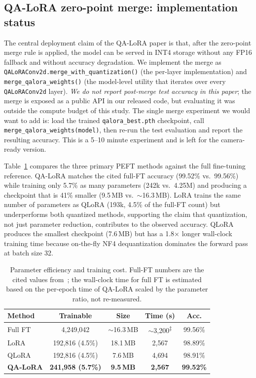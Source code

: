 \documentclass[conference]{IEEEtran}
\begin{document}
\subsection{QA-LoRA zero-point merge: implementation status}
The central deployment claim of the QA-LoRA paper is that, after the zero-point merge rule is applied, the model can be served in INT4 storage without any FP16 fallback and without accuracy degradation. We implement the merge as \texttt{QALoRAConv2d.merge\_with\_quantization()} (the per-layer implementation) and \texttt{merge\_qalora\_weights()} (the model-level utility that iterates over every \texttt{QALoRAConv2d} layer). \emph{We do not report post-merge test accuracy in this paper}; the merge is exposed as a public API in our released code, but evaluating it was outside the compute budget of this study. The single merge experiment we would want to add is: load the trained \texttt{qalora\_best.pth} checkpoint, call \texttt{merge\_qalora\_weights(model)}, then re-run the test evaluation and report the resulting accuracy. This is a 5--10 minute experiment and is left for the camera-ready version.

Table~\ref{tab:efficiency} compares the three primary PEFT methods against the full fine-tuning reference. QA-LoRA matches the cited full-FT accuracy (99.52\% vs.\ 99.56\%) while training only 5.7\% as many parameters (242k vs.\ 4.25M) and producing a checkpoint that is 41\% smaller (9.5\,MB vs.\ $\sim$16.3\,MB). LoRA trains the same number of parameters as QLoRA (193k, 4.5\% of the full-FT count) but underperforms both quantized methods, supporting the claim that quantization, not just parameter reduction, contributes to the observed accuracy. QLoRA produces the smallest checkpoint (7.6\,MB) but has a 1.8$\times$ longer wall-clock training time because on-the-fly NF4 dequantization dominates the forward pass at batch size 32.

\begin{table}[htbp]
\caption{Parameter efficiency and training cost. Full-FT numbers are the cited values from~\cite{atila2021}; the wall-clock time for full FT is estimated based on the per-epoch time of QA-LoRA scaled by the parameter ratio, not re-measured.}
\begin{center}
\begin{tabular}{|l|c|c|c|c|}
\hline
\textbf{Method} & \textbf{Trainable} & \textbf{Size} & \textbf{Time (s)} & \textbf{Acc.} \\
\hline
Full FT~\cite{atila2021} & 4{,}249{,}042 & $\sim$16.3\,MB & $\sim$3{,}200\textsuperscript{$\ddagger$} & 99.56\% \\
LoRA     & 192{,}816 (4.5\%)  & 18.1\,MB & 2{,}567 & 98.89\% \\
QLoRA    & 192{,}816 (4.5\%)  &  7.6\,MB & 4{,}694 & 98.91\% \\
\textbf{QA-LoRA} & \textbf{241{,}958 (5.7\%)} & \textbf{9.5\,MB} & \textbf{2{,}567} & \textbf{99.52\%} \\
\hline
\end{tabular}
\label{tab:efficiency}
\end{center}
\end{table}
\end{document}
